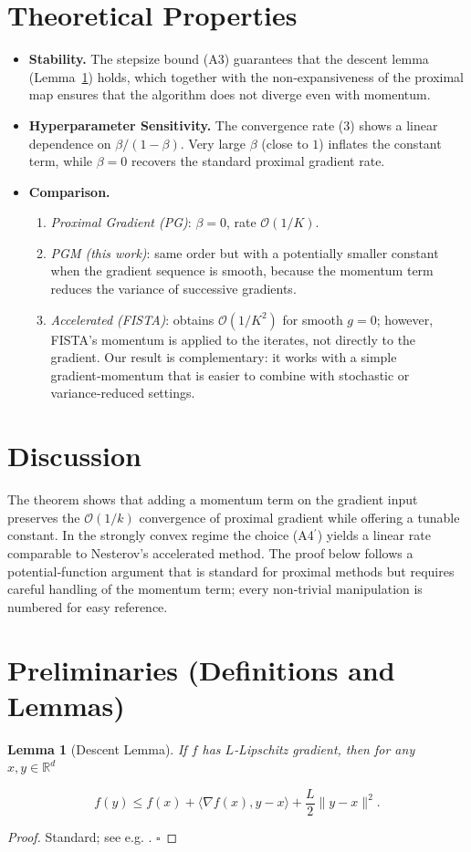 \documentclass{article}
\newtheorem{lemma}{Lemma}
\begin{document}
\section*{Theoretical Properties}
\begin{itemize}
\item \textbf{Stability.} The stepsize bound (A3) guarantees that the descent lemma (Lemma~\ref{lem:descent}) holds, which together with the non‑expansiveness of the proximal map ensures that the algorithm does not diverge even with momentum.
\item \textbf{Hyperparameter Sensitivity.} The convergence rate (3) shows a linear dependence on $\beta/(1-\beta)$. Very large $\beta$ (close to $1$) inflates the constant term, while $\beta=0$ recovers the standard proximal gradient rate.
\item \textbf{Comparison.}  
  \begin{enumerate}[label=(\alph*)]
  \item \emph{Proximal Gradient (PG)}: $\beta=0$, rate $\mathcal{O}(1/K)$.  
  \item \emph{PGM (this work)}: same order but with a potentially smaller constant when the gradient sequence is smooth, because the momentum term reduces the variance of successive gradients.
  \item \emph{Accelerated (FISTA)}: obtains $\mathcal{O}(1/K^2)$ for smooth $g=0$; however, FISTA’s momentum is applied to the iterates, not directly to the gradient. Our result is complementary: it works with a simple gradient‑momentum that is easier to combine with stochastic or variance‑reduced settings.
  \end{enumerate}
\end{itemize}

\section*{Discussion}
The theorem shows that adding a momentum term on the gradient input preserves the $\mathcal{O}(1/k)$ convergence of proximal gradient while offering a tunable constant. In the strongly convex regime the choice (A4$^\prime$) yields a linear rate comparable to Nesterov’s accelerated method. The proof below follows a potential‑function argument that is standard for proximal methods but requires careful handling of the momentum term; every non‑trivial manipulation is numbered for easy reference.

\newpage
\section*{Preliminaries (Definitions and Lemmas)}
\begin{lemma}[Descent Lemma]\label{lem:descent}
If $f$ has $L$‑Lipschitz gradient, then for any $x,y\in\mathbb{R}^d$  

\[
f(y)\le f(x)+\langle\nabla f(x),y-x\rangle+\frac{L}{2}\|y-x\|^2. \tag{L1}
\]
\end{lemma}
\begin{proof}
Standard; see e.g. \cite{Nesterov2004}. \hfill $\square$
\end{proof}
\end{document}
